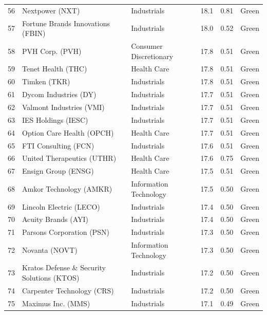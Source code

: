 \documentclass[11pt,a4paper]{article}
\begin{document}
{\begin{longtable}{r p{4.6cm} p{3cm} r r l}
56 & Nextpower (NXT) & Industrials & 18.1 & 0.81 & \cellcolor[HTML]{C6EFCE}Green \\
57 & Fortune Brands Innovations (FBIN) & Industrials & 18.0 & 0.52 & \cellcolor[HTML]{C6EFCE}Green \\
58 & PVH Corp. (PVH) & Consumer Discretionary & 17.8 & 0.51 & \cellcolor[HTML]{C6EFCE}Green \\
59 & Tenet Health (THC) & Health Care & 17.8 & 0.51 & \cellcolor[HTML]{C6EFCE}Green \\
60 & Timken (TKR) & Industrials & 17.8 & 0.51 & \cellcolor[HTML]{C6EFCE}Green \\
61 & Dycom Industries (DY) & Industrials & 17.7 & 0.51 & \cellcolor[HTML]{C6EFCE}Green \\
62 & Valmont Industries (VMI) & Industrials & 17.7 & 0.51 & \cellcolor[HTML]{C6EFCE}Green \\
63 & IES Holdings (IESC) & Industrials & 17.7 & 0.51 & \cellcolor[HTML]{C6EFCE}Green \\
64 & Option Care Health (OPCH) & Health Care & 17.7 & 0.51 & \cellcolor[HTML]{C6EFCE}Green \\
65 & FTI Consulting (FCN) & Industrials & 17.6 & 0.51 & \cellcolor[HTML]{C6EFCE}Green \\
66 & United Therapeutics (UTHR) & Health Care & 17.6 & 0.75 & \cellcolor[HTML]{C6EFCE}Green \\
67 & Ensign Group (ENSG) & Health Care & 17.5 & 0.51 & \cellcolor[HTML]{C6EFCE}Green \\
68 & Amkor Technology (AMKR) & Information Technology & 17.5 & 0.50 & \cellcolor[HTML]{C6EFCE}Green \\
69 & Lincoln Electric (LECO) & Industrials & 17.4 & 0.50 & \cellcolor[HTML]{C6EFCE}Green \\
70 & Acuity Brands (AYI) & Industrials & 17.4 & 0.50 & \cellcolor[HTML]{C6EFCE}Green \\
71 & Parsons Corporation (PSN) & Industrials & 17.3 & 0.50 & \cellcolor[HTML]{C6EFCE}Green \\
72 & Novanta (NOVT) & Information Technology & 17.3 & 0.50 & \cellcolor[HTML]{C6EFCE}Green \\
73 & Kratos Defense \& Security Solutions (KTOS) & Industrials & 17.2 & 0.50 & \cellcolor[HTML]{C6EFCE}Green \\
74 & Carpenter Technology (CRS) & Industrials & 17.2 & 0.50 & \cellcolor[HTML]{C6EFCE}Green \\
75 & Maximus Inc. (MMS) & Industrials & 17.1 & 0.49 & \cellcolor[HTML]{C6EFCE}Green \\

\end{longtable}}
\end{document}
